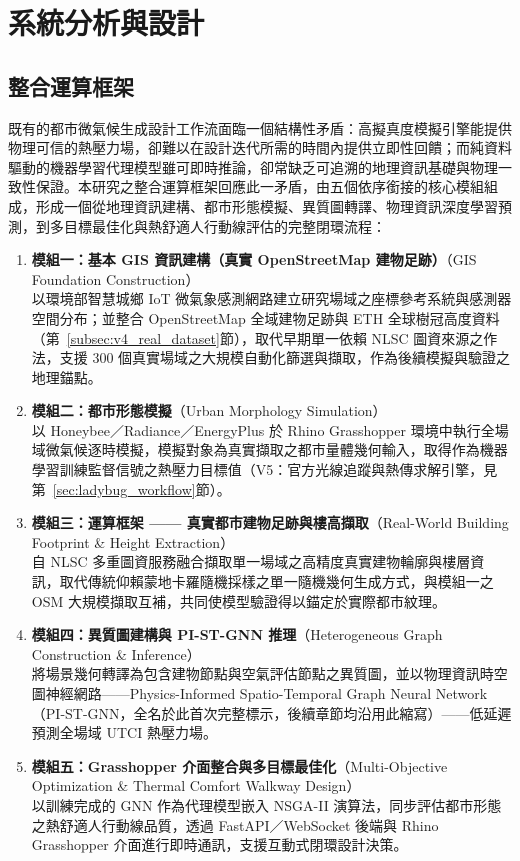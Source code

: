 \chapter{系統分析與設計}
\label{chapter:methodology}

\section{整合運算框架}
\label{sec:framework}

既有的都市微氣候生成設計工作流面臨一個結構性矛盾：高擬真度模擬引擎能提供物理可信的熱壓力場，卻難以在設計迭代所需的時間內提供立即性回饋；而純資料驅動的機器學習代理模型雖可即時推論，卻常缺乏可追溯的地理資訊基礎與物理一致性保證。本研究之整合運算框架回應此一矛盾，由五個依序銜接的核心模組組成，形成一個從地理資訊建構、都市形態模擬、異質圖轉譯、物理資訊深度學習預測，到多目標最佳化與熱舒適人行動線評估的完整閉環流程：

\begin{enumerate}
    \item \textbf{模組一：基本 GIS 資訊建構（真實 OpenStreetMap 建物足跡）}（GIS Foundation Construction）\\
    以環境部智慧城鄉 IoT 微氣象感測網路建立研究場域之座標參考系統與感測器空間分布；並整合 OpenStreetMap 全域建物足跡與 ETH 全球樹冠高度資料（第~\ref{subsec:v4_real_dataset}節），取代早期單一依賴 NLSC 圖資來源之作法，支援 300 個真實場域之大規模自動化篩選與擷取，作為後續模擬與驗證之地理錨點。
    \item \textbf{模組二：都市形態模擬}（Urban Morphology Simulation）\\
    以 Honeybee／Radiance／EnergyPlus 於 Rhino Grasshopper 環境中執行全場域微氣候逐時模擬，模擬對象為真實擷取之都市量體幾何輸入，取得作為機器學習訓練監督信號之熱壓力目標值（V5：官方光線追蹤與熱傳求解引擎，見第~\ref{sec:ladybug_workflow}節）。
    \item \textbf{模組三：運算框架 —— 真實都市建物足跡與樓高擷取}（Real-World Building Footprint \& Height Extraction）\\
    自 NLSC 多重圖資服務融合擷取單一場域之高精度真實建物輪廓與樓層資訊，取代傳統仰賴蒙地卡羅隨機採樣之單一隨機幾何生成方式，與模組一之 OSM 大規模擷取互補，共同使模型驗證得以錨定於實際都市紋理。
    \item \textbf{模組四：異質圖建構與 PI-ST-GNN 推理}（Heterogeneous Graph Construction \& Inference）\\
    將場景幾何轉譯為包含建物節點與空氣評估節點之異質圖，並以物理資訊時空圖神經網路——Physics-Informed Spatio-Temporal Graph Neural Network（PI-ST-GNN，全名於此首次完整標示，後續章節均沿用此縮寫）——低延遲預測全場域 UTCI 熱壓力場。
    \item \textbf{模組五：Grasshopper 介面整合與多目標最佳化}（Multi-Objective Optimization \& Thermal Comfort Walkway Design）\\
    以訓練完成的 GNN 作為代理模型嵌入 NSGA-II 演算法，同步評估都市形態之熱舒適人行動線品質，透過 FastAPI／WebSocket 後端與 Rhino Grasshopper 介面進行即時通訊，支援互動式閉環設計決策。
\end{enumerate}

